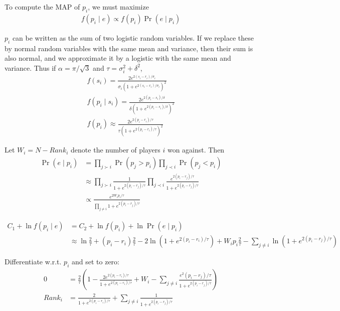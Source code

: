 \documentclass{article}
\begin{document}
To compute the MAP of $p_i$, we must maximize
\begin{align}
f(p_i\mid e) \propto f(p_i) \Pr(e\mid p_i)
\end{align}

$p_i$ can be written as the sum of two logistic random variables. If we replace these by normal random variables with the same mean and variance, then their sum is also normal, and we approximate it by a logistic with the same mean and variance. Thus if $\alpha = \pi/\sqrt{3}$ and $\tau = \sigma_i^2 + \delta^2$,
\begin{align}
f(s_i) = \frac { 2e^{2(s_i-r_i)/\sigma_i} } { \sigma_i\left(1 + e^{2(s_i-r_i)/\sigma_i} \right)^2 }
\\f(p_i\mid s_i) = \frac { 2e^{2(p_i-s_i)/\delta} } { \delta\left(1 + e^{2(p_i-s_i)/\delta} \right)^2}
\\f(p_i) \approx \frac { 2e^{2(p_i-r_i)/\tau} } { \tau\left(1 + e^{2(p_i-r_i)/\tau} \right)^2}
\end{align}

Let $W_i = N - Rank_i$ denote the number of players $i$ won against. Then
\begin{align}
\Pr(e\mid p_i) &= \prod_{j \succ i} \Pr(p_j > p_i) \prod_{j \prec i} \Pr(p_j < p_i)
\\&\approx \prod_{j \succ i} \frac {1} {1 + e^{2(p_i-r_j)/\tau}} \prod_{j \prec i} \frac {e^{2(p_i-r_j)/\tau}} {1 + e^{2(p_i-r_j)/\tau}}
\\&\propto \frac {e^{2W_ip_i/\tau}} {\prod_{j\neq i} 1 + e^{2(p_i-r_j)/\tau}}
\end{align}

\begin{align}
C_1 + \ln f(p_i\mid e) &= C_2 + \ln f(p_i) + \ln \Pr(e\mid p_i)
\\&\approx \ln \frac{2}{\tau} + (p_i-r_i)\frac{2}{\tau} - 2\ln\left(1 + e^{2(p_i-r_i)/\tau} \right) + W_ip_i\frac{2}{\tau} - \sum_{j\neq i} \ln\left(1 + e^{2(p_i-r_j)/\tau}\right)
\end{align}

Differentiate w.r.t. $p_i$ and set to zero:
\begin{align}
0 &= \frac{2}{\tau} \left( 1 - \frac {2e^{2(p_i-r_i)/\tau}} {1 + e^{2(p_i-r_i)/\tau}} + W_i - \sum_{j\neq i} \frac {e^2{(p_i-r_j)/\tau}} {1 + e^{2(p_i-r_j)/\tau}} \right)
\\Rank_i &= \frac {2} {1 + e^{2(p_i-r_i)/\tau}} + \sum_{j\neq i} \frac {1} {1 + e^{2(p_i-r_j)/\tau}}
\end{align}
\end{document}
